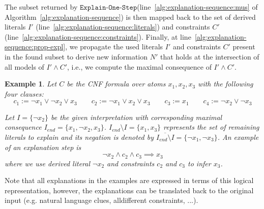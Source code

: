 \documentclass[twoside,11pt]{article}
\newcommand\m[1]{\mathcal{#1}}
\newtheorem{example}{Example}
\newcommand\comment[1]{\marginpar{\tiny #1}}
\renewcommand\comment[1]{#1}
\newcommand{\emilio}[1]{{\comment{\color{red}Emilio: #1}}}
\newcommand{\reviewercomment}[1]{{\comment{\color{DarkOrchid}Reviewer: #1}}}
\newcommand{\bart}[1]{{\comment{\color{OliveGreen}Bart: #1}}}
\newcommand\Iend{\ensuremath{I_\mathit{end} }\xspace}
\newcommand\formulac{\ensuremath{\m{C} }\xspace}
\newcommand\formularunning{\ensuremath{C }\xspace}
\newcommand\mm[1]{\ensuremath{#1}\xspace}
\newcommand\call[1]{\mm{\texttt{#1}}}
\newcommand\negset[1]{\mm{\overline{#1}}}
\newcommand\onestep{\ensuremath{\call{Explain-One-Step}}\xspace}
\begin{document}

The subset returned by \onestep (line~\ref{alg:explanation-sequence:mus} of Algorithm~\ref{alg:explanation-sequence}) is then mapped back to the set of derived literals $I'$ (line~\ref{alg:explanation-sequence:literals}) and constraints $C'$ (line~\ref{alg:explanation-sequence:constraints}). 
Finally, at line~\ref{alg:explanation-sequence:prop-expl}, we propagate the used literals $I'$ and constraints $C'$ present in the found subset to derive new information $N'$ that holds at the intersection of all models of $I' \wedge C'$, i.e., we compute the maximal consequence of $I' \wedge C'$.

\begin{example}\label{example:intro2}%
	Let $\formularunning$ 	be the CNF formula over atoms $x_1, x_2, x_3$ with the following four clauses:
	\[ c_1 := \lnot x_1 \vee \lnot x_2 \vee x_3 \qquad  c_2 := \lnot x_1 \vee  x_2 \vee x_3 \qquad  c_3 := x_1 \qquad c_4 := \lnot x_2 \vee \lnot x_3 \]
	
	Let $I = \{\lnot x_2\}$ be the given \emph{interpretation} with corresponding maximal consequence $\Iend = \{x_1, \lnot x_2,  x_3\}$.
	$\Iend \setminus I = \{x_1, x_3\}$ represents the set of remaining literals to explain and its negation is denoted by $\negset{\Iend \setminus I} = \{\lnot x_1, \lnot x_3\}$. 
	An example of an explanation step is \[\lnot x_2 \wedge c_2 \wedge c_3 \implies x_3 \] where we use derived literal $\lnot x_2$ and constraints $ c_2$ and $ c_3$ to infer $x_3$.
	
\end{example}

Note that all explanations in the examples are expressed in terms of this logical representation, however, the explanations can be translated back to the original input (e.g. natural language clues, alldifferent constraints, ...).

\end{document}
